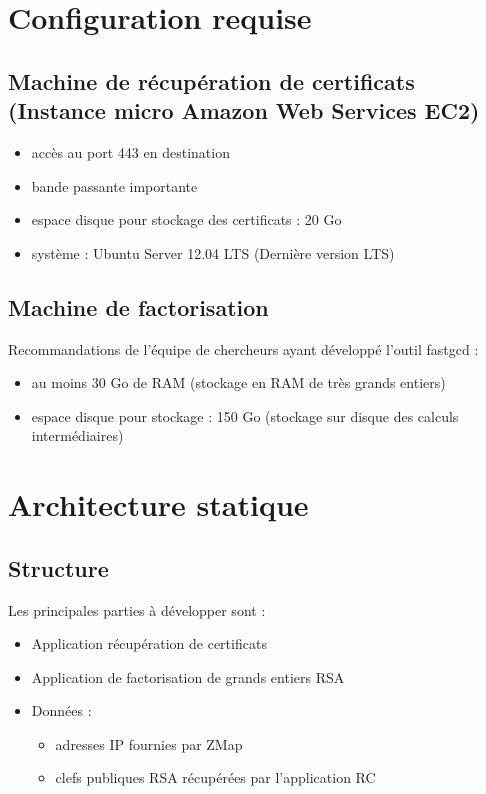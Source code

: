 \documentclass[a4paper,11pt,french]{article}
\begin{document}
\section{Configuration requise}
\subsection{Machine de récupération de certificats (Instance micro Amazon Web Services EC2)}
\begin{itemize}
\item accès au port 443 en destination
\item bande passante importante
\item espace disque pour stockage des certificats : 20 Go
\item système : Ubuntu Server 12.04 LTS (Dernière version LTS)
\end{itemize}

\subsection{Machine de factorisation}
Recommandations de l'équipe de chercheurs ayant développé l'outil fastgcd :
\begin{itemize}
\item au moins 30 Go de RAM (stockage en RAM de très grands entiers)
\item espace disque pour stockage : 150 Go (stockage sur disque des calculs intermédiaires)
\end{itemize}

\section{Architecture statique}

\subsection{Structure}
Les principales parties à développer sont :
\begin{itemize}
\item Application récupération de certificats
\item Application de factorisation de grands entiers RSA
\item Données :
\begin{itemize}
\item adresses IP fournies par ZMap
\item clefs publiques RSA récupérées par l'application RC
\end{itemize}
\end{itemize}
\end{document}

